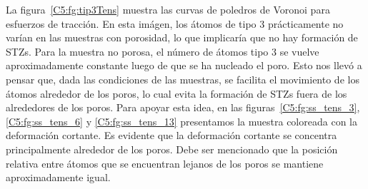 La figura~\ref{C5:fg:tip3Tens} muestra las curvas de poledros de Voronoi para esfuerzos de tracción. En esta imágen, los átomos de tipo 3
prácticamente no varían en las muestras con porosidad, lo que implicaría que no hay formación de STZs.
Para la muestra no porosa, el número de átomos tipo 3 se vuelve aproximadamente constante luego de que se ha nucleado el poro. Esto
nos llevó a pensar que, dada las condiciones de las muestras, se facilita el movimiento de los átomos alrededor de los poros, lo cual evita
la formación de STZs fuera de los alrededores de los poros. Para apoyar esta idea, en las figuras~\ref{C5:fg:ss_tens_3}, \ref{C5:fg:ss_tens_6} y \ref{C5:fg:ss_tens_13} presentamos
la muestra coloreada con la deformación cortante. Es evidente que la deformación cortante se concentra principalmente alrededor
de los poros. Debe ser mencionado que la posición relativa entre átomos que se encuentran lejanos de los poros se mantiene aproximadamente igual.









